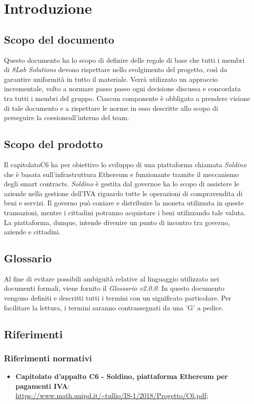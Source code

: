 \section{Introduzione}
\subsection{Scopo del documento}
Questo documento ha lo scopo di definire delle regole di base che tutti i membri 
di \textit{8Lab Solutions} devono rispettare nello svolgimento del progetto, 
così da garantire uniformità in tutto il materiale. Verrà utilizzato un 
approccio incrementale, volto a normare passo passo ogni decisione discussa e 
concordata tra tutti i membri del gruppo. Ciascun componente è obbligato a 
prendere visione di tale documento e a rispettare le norme in esso descritte 
allo scopo di perseguire la coesione\glosp all'interno del team.

\subsection{Scopo del prodotto}
Il capitolato\glosp C6 ha per obiettivo lo sviluppo di una piattaforma chiamata \textit{Soldino} che è basata sull'infrastruttura Ethereum\glo{} e funzionante tramite il meccanismo degli smart contracts\glo{}. \textit{Soldino} è gestita dal governo\glosp e ha lo scopo di assistere le aziende nella gestione dell'IVA riguardo tutte le operazioni di compravendita di beni e servizi. Il governo può coniare e 
distribuire la moneta utilizzata in queste transazioni, mentre i cittadini 
potranno acquistare i beni utilizzando tale valuta. La piattaforma, dunque, 
intende divenire un punto di incontro tra governo, aziende e cittadini.

\subsection{Glossario}
Al fine di evitare possibili ambiguità relative al linguaggio utilizzato nei documenti formali, viene fornito il \textit{Glossario v2.0.0}. In questo documento vengono definiti e descritti tutti i termini con un significato particolare. Per facilitare la lettura, i termini saranno contrassegnati da una 'G' a pedice.

\subsection{Riferimenti}
\subsubsection{Riferimenti normativi}
\begin{itemize}

	\item \textbf{Capitolato d'appalto C6 - Soldino, piattaforma Ethereum per pagamenti IVA}: \\
		\url{https://www.math.unipd.it/~tullio/IS-1/2018/Progetto/C6.pdf};
\end{itemize}

